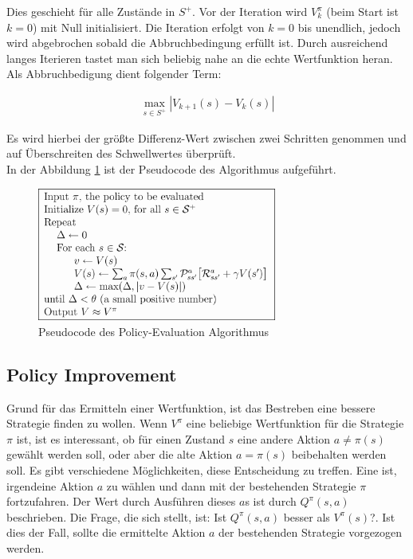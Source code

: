 \documentclass[10pt]{scrartcl}
\begin{document}
Dies geschieht für alle Zustände in $S^+$. Vor der Iteration wird $V^\pi_k$  (beim Start ist $k=0$) mit Null initialisiert. Die Iteration erfolgt von $k=0$ bis unendlich, jedoch wird abgebrochen sobald die  Abbruchbedingung erfüllt ist. Durch ausreichend langes Iterieren tastet man sich beliebig nahe an die echte Wertfunktion heran. Als Abbruchbedigung dient folgender Term:

\begin{align*}
\max\limits_{s\in S^+} |V_{k+1}(s)-V_k(s)|
\end{align*}

Es wird hierbei der größte Differenz-Wert zwischen zwei Schritten genommen und  auf Überschreiten des Schwellwertes überprüft.\\
In der Abbildung \ref{fig:policyevaluation} ist der Pseudocode des Algorithmus aufgeführt.

\begin{figure}[htc]
    \centering
    \includegraphics[width=0.7\textwidth]{Grafiken/21pe.png}
    \caption{Pseudocode des Policy-Evaluation Algorithmus}
    \label{fig:policyevaluation}
\end{figure}

\subsection{Policy Improvement}
Grund für das Ermitteln einer Wertfunktion, ist das Bestreben eine bessere Strategie finden zu wollen. Wenn $V^\pi$ eine beliebige Wertfunktion für die  Strategie $\pi$ ist,  ist es interessant, ob für einen Zustand $s$ eine andere Aktion $a\neq\pi(s)$   gewählt werden soll, oder aber die alte Aktion $a=\pi(s)$ beibehalten werden soll.
Es gibt verschiedene Möglichkeiten, diese  Entscheidung zu treffen. Eine ist, irgendeine Aktion $a$ zu wählen und dann mit der bestehenden Strategie $\pi$ fortzufahren. Der Wert durch Ausführen dieses $a$s ist durch $Q^\pi(s,a)$ beschrieben. Die Frage, die sich stellt, ist: Ist $Q^\pi(s,a)$ besser als $V^\pi(s)$?.
Ist dies der Fall, sollte die ermittelte Aktion $a$ der bestehenden Strategie vorgezogen werden.
\end{document}
